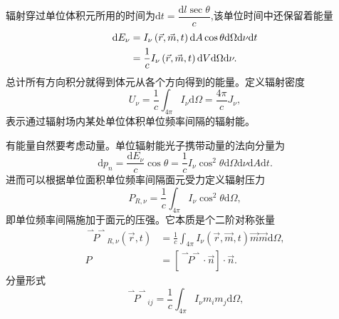 \documentclass[../天体物理基础.tex]{subfiles}
\begin{document}
辐射穿过单位体积元所用的时间为$\mathrm{d}t=\dfrac{\mathrm{d}l\sec\theta}{c}$,该单位时间中还保留着能量
\begin{align}
\mathrm{d}E_{\nu}&=I_\nu\left(\vec{r},\vec{m},t\right)\mathrm{d}A\cos\theta\mathrm{d}\Omega\mathrm{d}\nu\mathrm{d}t\notag\\
&=\frac{1}{c}I_\nu\left(\vec{r},\vec{m},t\right)\mathrm{d}V\mathrm{d}\Omega\mathrm{d}\nu.
\end{align}
总计所有方向积分就得到体元从各个方向得到的能量。定义辐射密度
\begin{equation}
U_{\nu}=\frac1c\int_{4\pi}I_{\nu}\mathrm{d}\Omega=\frac{4\pi}{c}J_{\nu},
\end{equation}
表示通过辐射场内某处单位体积单位频率间隔的辐射能。

有能量自然要考虑动量。单位辐射能光子携带动量的法向分量为
\begin{equation}
\mathrm{d}p_{n}=\frac{\mathrm{d}E_{\nu}}{c}\cos\theta=\frac{1}{c}I_{\nu}\cos^{2}\theta\mathrm{d}\Omega\mathrm{d}\nu\mathrm{d}A\mathrm{d}t.
\end{equation}
进而可以根据单位面积单位频率间隔面元受力定义辐射压力
\begin{equation}
P_{R,\nu}=\frac1c\int_{4\pi}I_{\nu}\cos^{2}\theta\mathrm{d}\Omega,
\end{equation}
即单位频率间隔施加于面元的压强。它本质是个二阶对称张量
\begin{align}
\overset{\rightharpoonup\!\!\!\rightharpoonup}{P}_{R,\nu}\left(\vec{r},t\right)&=\frac{1}{c}\int_{4\pi}I_\nu\left(\vec{r},\vec{m},t\right)\vec{m}\vec{m}\mathrm{d}\Omega,\\
P&=\left[\overset{\rightharpoonup\!\!\!\rightharpoonup}P\cdot\vec n\right]\cdot\vec n.
\end{align}
分量形式
\begin{equation}
\overset{\rightharpoonup\!\!\!\rightharpoonup}P_{ij}=\frac{1}{c}\int_{4\pi}I_{\nu}m_{i}m_{j}\mathrm{d}\Omega,
\end{equation}
\end{document}
